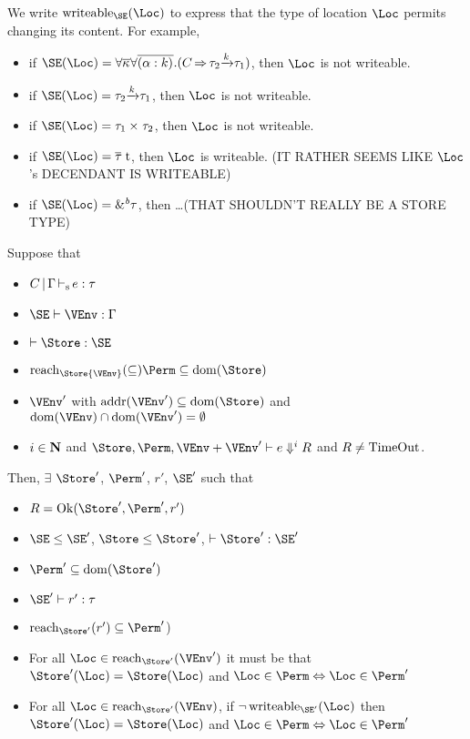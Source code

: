We write $\Writeable\SE\Loc$ to express that the type of location
$\Loc$ permits changing its content. For example,
\begin{itemize}
\item if $\SE (\Loc) =
  \forall\Multi\kvar\forall\Multi{\bvar{\alpha}{k}}.(\qual{C}{\tau_2\tarr{k}\tau_1})$,
  then $\Loc$ is not writeable.
\item if $\SE (\Loc) = \tau_2\tarr{k}{\tau_1}$, then $\Loc$ is not
  writeable.
\item if $\SE (\Loc) = \tyPair{\tau_1}{\tau_2}$, then $\Loc$ is not writeable.
\item if $\SE (\Loc) = \tapp{t}{\Multi\tau}$, then $\Loc$ is
  writeable. (IT RATHER SEEMS LIKE $\Loc$'s DECENDANT IS WRITEABLE)
\item if $\SE (\Loc) = \borrow\tau$, then \dots (THAT SHOULDN'T REALLY
  BE A STORE TYPE)
\end{itemize}
\begin{theorem}
  Suppose that
  \begin{itemize}
  \item $C \operatorname{|} \Gamma \operatorname{\vdash_s} e : \tau$
  \item $\SE \vdash \VEnv : \E$
  \item $\vdash \Store : \SE$
  \item $\Reach\Store{\VEnv} \subseteq \Perm \subseteq \Dom\Store$
  \item  $\VEnv'$ with $\Addresses{\VEnv'}
    \subseteq \Dom\Store$ and $\Dom\VEnv \cap \Dom{\VEnv'}=\emptyset$
  \item  $i\in\mathbf{N}$ and $\Store, \Perm, \VEnv + \VEnv' \vdash {e}
    \Downarrow^i R$ and $R\ne \operatorname{TimeOut}$.
  \end{itemize}
  Then,
  $\exists$ $\Store'$, $\Perm'$, $r'$, $\SE'$ such that
  \begin{itemize}
  \item
    $R = \Ok{\Store', \Perm', r'}$  
  \item $\SE \le \SE'$, $\Store \le \Store'$,
    $\vdash \Store' : \SE'$ 
  \item $\Perm' \subseteq \Dom{\Store'}$
  \item $\SE' \vdash r' : \tau$
  \item $\Reach{\Store'}{r'} \subseteq \Perm'$)
  \item For all $\Loc \in \Reach{\Store'}{\VEnv'}$ it must be that
    $\Store' (\Loc) = \Store (\Loc)$
    and $\Loc\in\Perm \Leftrightarrow \Loc\in\Perm'$ 
  \item For all $\Loc \in \Reach{\Store'}{\VEnv}$,
    if $\neg \Writeable{\SE'}\Loc $ then
    $\Store' (\Loc) = \Store (\Loc)$
    and $\Loc\in\Perm \Leftrightarrow \Loc\in\Perm'$ 
  \end{itemize}
\end{theorem}
    
